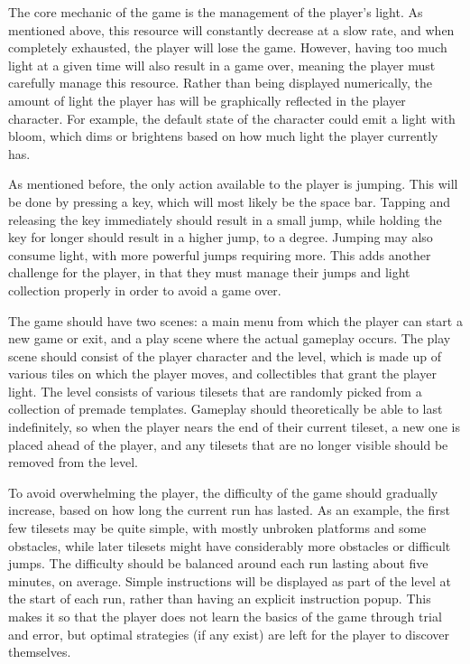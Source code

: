 \documentclass[10pt]{article}
\begin{document}
The core mechanic of the game is the management of the player's light. As mentioned above, this resource will constantly decrease at a slow rate,
and when completely exhausted, the player will lose the game. However, having too much light at a given time will also result in a game over,
meaning the player must carefully manage this resource. Rather than being displayed numerically, the amount of light the player has will be
graphically reflected in the player character. For example, the default state of the character could emit a light with bloom, which dims
or brightens based on how much light the player currently has.

As mentioned before, the only action available to the player is jumping. This will be done by pressing a key, which will most likely be the space bar.
Tapping and releasing the key immediately should result in a small jump, while holding the key for longer should result in a higher jump, to a degree.
Jumping may also consume light, with more powerful jumps requiring more. This adds another challenge for the player, in that they must manage their jumps
and light collection properly in order to avoid a game over.

The game should have two scenes: a main menu from which the player can start a new game or exit, and a play scene where the actual gameplay occurs.
The play scene should consist of the player character and the level, which is made up of various tiles on which the player moves, and collectibles
that grant the player light. The level consists of various tilesets that are randomly picked from a collection of premade templates. Gameplay should
theoretically be able to last indefinitely, so when the player nears the end of their current tileset, a new one is placed ahead of the player,
and any tilesets that are no longer visible should be removed from the level.

To avoid overwhelming the player, the difficulty of the game should gradually increase, based on how long the current run has lasted.
As an example, the first few tilesets may be quite simple, with mostly unbroken platforms and some obstacles, while later tilesets
might have considerably more obstacles or difficult jumps. The difficulty should be balanced around each run lasting about five minutes, on average.
Simple instructions will be displayed as part of the level at the start of each run, rather than having an explicit instruction popup.
This makes it so that the player does not learn the basics of the game through trial and error, but optimal strategies (if any exist)
are left for the player to discover themselves.
\end{document}
